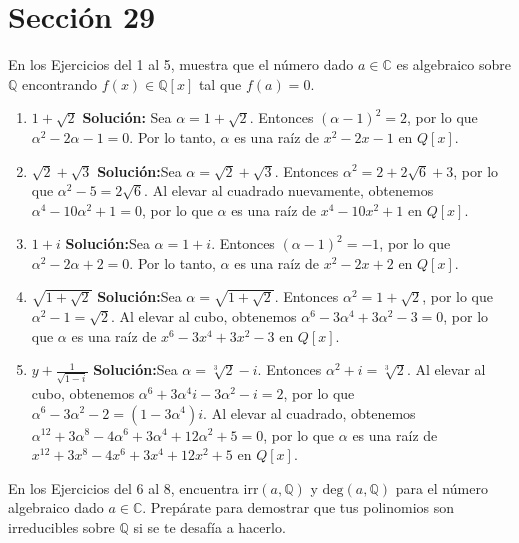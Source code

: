 \section*{Sección 29}

En los Ejercicios del 1 al 5, muestra que el número dado $a \in \mathbb{C}$ es algebraico sobre $\mathbb{Q}$ encontrando $f(x) \in \mathbb{Q}[x]$ tal que $f(a) = 0$.

\begin{enumerate}
    \item $1 + \sqrt{2}$
    \textbf{Solución:} Sea $\alpha = 1 + \sqrt{2}$. Entonces $(\alpha - 1)^2 = 2$, por lo que $\alpha^2 - 2\alpha - 1 = 0$. Por lo tanto, $\alpha$ es una raíz de $x^2 - 2x - 1$ en $Q[x]$.
    \item $\sqrt{2} + \sqrt{3}$
    \textbf{Solución:}Sea $\alpha = \sqrt{2} + \sqrt{3}$. Entonces $\alpha^2 = 2 + 2\sqrt{6} + 3$, por lo que $\alpha^2 - 5 = 2\sqrt{6}$. Al elevar al cuadrado nuevamente, obtenemos $\alpha^4 - 10\alpha^2 + 1 = 0$, por lo que $\alpha$ es una raíz de $x^4 - 10x^2 + 1$ en $Q[x]$.
    \item $1 + i$
    \textbf{Solución:}Sea $\alpha = 1 + i$. Entonces $(\alpha - 1)^2 = -1$, por lo que $\alpha^2 - 2\alpha + 2 = 0$. Por lo tanto, $\alpha$ es una raíz de $x^2 - 2x + 2$ en $Q[x]$.
    \item $\sqrt{1 + \sqrt{2}}$
    \textbf{Solución:}Sea $\alpha = \sqrt{1 + \sqrt{2}}$. Entonces $\alpha^2 = 1 + \sqrt{2}$, por lo que $\alpha^2 - 1 = \sqrt{2}$. Al elevar al cubo, obtenemos $\alpha^6 - 3\alpha^4 + 3\alpha^2 - 3 = 0$, por lo que $\alpha$ es una raíz de $x^6 - 3x^4 + 3x^2 - 3$ en $Q[x]$.
    \item $y + \frac{1}{\sqrt{1 - i}}$
    \textbf{Solución:}Sea $\alpha = \sqrt[3]{2} - i$. Entonces $\alpha^2 + i = \sqrt[3]{2}$. Al elevar al cubo, obtenemos $\alpha^6 + 3\alpha^4i - 3\alpha^2 - i = 2$, por lo que $\alpha^6 - 3\alpha^2 - 2 = (1 - 3\alpha^4)i$. Al elevar al cuadrado, obtenemos $\alpha^{12} + 3\alpha^8 - 4\alpha^6 + 3\alpha^4 + 12\alpha^2 + 5 = 0$, por lo que $\alpha$ es una raíz de $x^{12} + 3x^8 - 4x^6 + 3x^4 + 12x^2 + 5$ en $Q[x]$.
\end{enumerate}

En los Ejercicios del 6 al 8, encuentra $\text{irr}(a, \mathbb{Q})$ y $\text{deg}(a, \mathbb{Q})$ para el número algebraico dado $a \in \mathbb{C}$. Prepárate para demostrar que tus polinomios son irreducibles sobre $\mathbb{Q}$ si se te desafía a hacerlo.

